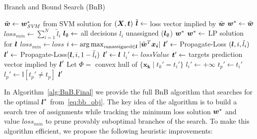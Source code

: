 \begin{algorithm}[t!]
\caption{Branch and Bound Search (BnB)}
\label{alg:BnB.Final}
{\footnotesize
\begin{algorithmic}[1]
\STATE $\tilde{\boldsymbol{w}} \gets \boldsymbol{w}^*_{\mathit{SVM}}$ from SVM solution for $(\boldsymbol{X},\boldsymbol{t})$
\STATE $\tilde{\boldsymbol{l}} \gets $ loss vector implied by $\tilde{\boldsymbol{w}}$
\STATE $\boldsymbol{w}^* \gets \tilde{\boldsymbol{w}}$
\STATE $loss_{min} \gets \sum_{i=1}^N \tilde{l}_i$ 
\STATE $\boldsymbol{l}_\emptyset \gets $ all decisions $l_i$ unassigned
($\boldsymbol{l}_\emptyset$)
 $\boldsymbol{w}^*$
\STATE
{}
      \STATE $\boldsymbol{w}^* \gets$ LP solution for $\boldsymbol{l}$ 
      \STATE $loss_{min} \gets loss$
   \ELSE
      \STATE $i \gets \argmax_{i \text{unassigned} \in \l} |\tilde{\w}^T\boldsymbol{x_i}|$
      \STATE $\boldsymbol{l}' \gets$ {\sc Propagate-Loss} $(\boldsymbol{l}, i, \tilde{l}_i)$
      \ENDIF
      \STATE $\boldsymbol{l}' \gets$ {\sc Propagate-Loss}{$(\boldsymbol{l}, i, 1 - \tilde{l}_i)$}
      \ENDIF
   \ENDIF
\ENDFUNCTION
\STATE
{} 
   \STATE $\boldsymbol{l}' \gets \boldsymbol{l}$
   \STATE $l_i' \gets lossValue$   
   \STATE $\boldsymbol{t}' \gets $ targets prediction vector implied by $\boldsymbol{l}'$ 
   \STATE Let $\Phi =$ convex hull of $\{ \boldsymbol{x_k} \; | \; t_k'=t_i' \}$ 
      \STATE $l_i' \gets +\infty$ 
   \ELSE
         \STATE $t_p' \gets t_i'$ 
         \STATE $l_p' \gets \mathbb{I} [t_p' \not= t_p]$
      \ENDIF
   \ENDFOR
   \ENDIF  
    $\boldsymbol{l}'$ 
\ENDFUNCTION
\ENDFUNCTION
\end{algorithmic}
}
\end{algorithm}

In Algorithm~\ref{alg:BnB.Final} we provide the full BnB algorithm that
searches for the optimal $\boldsymbol{l}^*$ from~\eqref{eq:bb_obj}.  The key idea
of the algorithm is to build a search tree of assignments while
tracking the minimum loss solution $\boldsymbol{w}^*$ and value $loss_{min}$ to
prune provably suboptimal branches of the search.  To make this
algorithm efficient, we propose the following heuristic improvements:

